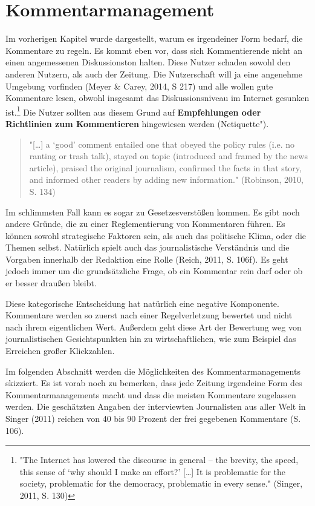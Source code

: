 \chapter{Kommentarmanagement}


Im vorherigen Kapitel wurde dargestellt, warum es irgendeiner Form bedarf, die Kommentare zu regeln. 
Es kommt eben vor, dass sich Kommentierende nicht an einen angemessenen Diskussionston halten. Diese Nutzer schaden sowohl den anderen Nutzern, als auch der Zeitung. Die Nutzerschaft will ja eine angenehme Umgebung vorfinden (Meyer \& Carey, 2014, S 217) und alle wollen \glqq gute\grqq\- Kommentare lesen, obwohl insgesamt das Diskussionsniveau im Internet gesunken ist.\footnote{"The Internet has lowered the
discourse in general – the brevity, the speed, this sense of ‘why should I make
an effort?' [\ldots] It is problematic for the society, problematic for the democracy, problematic in every sense." (Singer, 2011, S. 130)}
Die Nutzer sollten aus diesem Grund auf {\bfseries Empfehlungen oder Richtlinien zum Kommentieren} hingewiesen werden (\glqq Netiquette"). 


\begin{quote}
"[\ldots] a ‘good’ comment entailed one that obeyed the policy rules (i.e. no
ranting or trash talk), stayed on topic (introduced and framed by the news article), praised
the original journalism, confirmed the facts in that story, and informed other readers by
adding new information." (Robinson, 2010, S. 134)
\end{quote}

Im schlimmsten Fall kann es sogar zu Gesetzesverstößen kommen. Es gibt noch andere Gründe, die zu einer Reglementierung von Kommentaren führen. Es können sowohl strategische Faktoren sein, als auch das politische Klima, oder die Themen selbst. Natürlich spielt auch das journalistische Verständnis und die Vorgaben innerhalb der Redaktion eine Rolle (Reich, 2011, S. 106f).
Es geht jedoch immer um die grundsätzliche Frage, ob ein Kommentar \glqq rein\grqq\- darf oder ob er besser \glqq draußen\grqq\-  bleibt.

Diese kategorische Entscheidung hat natürlich eine negative Komponente. Kommentare werden so zuerst nach einer Regelverletzung bewertet und nicht nach ihrem eigentlichen Wert. Außerdem geht diese Art der Bewertung weg von journalistischen Gesichtspunkten hin zu wirtschaftlichen, wie zum Beispiel das Erreichen großer Klickzahlen.  

Im folgenden Abschnitt werden die Möglichkeiten des Kommentarmanagements skizziert. Es ist vorab noch zu bemerken, dass jede Zeitung irgendeine Form des Kommentarmanagements macht und dass die meisten Kommentare zugelassen werden. Die geschätzten Angaben der interviewten Journalisten aus aller Welt in Singer (2011) reichen von 40 bis 90 Prozent der frei gegebenen Kommentare (S. 106). 


